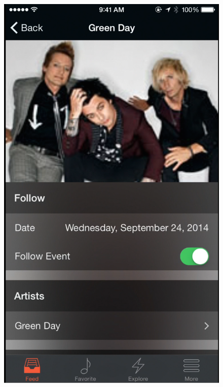         \begin{figure}
        	\centering
        	\begin{minipage}{.5\textwidth}
        		\centering
        		\includegraphics[width=.7\linewidth]{./pics/app3.png}
        	\end{minipage}%
        	\begin{minipage}{.5\textwidth}
        		\centering

\end{minipage}
\end{figure}
